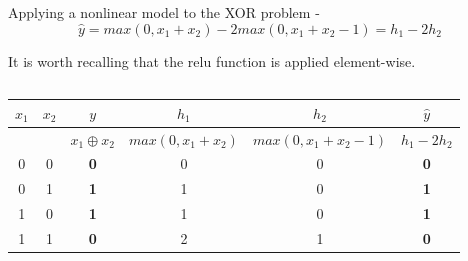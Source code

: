 \begin{frame}[t,allowframebreaks]{Applying a nonlinear model to the XOR problem -}
    \begin{equation}
        \hat{y} = 
        max(0,x_1+x_2) - 2 max(0,x_1+x_2-1) =
        h_1 - 2 h_2
        \label{eq:learn_xor_nonlinear_model_final_w_weights}
    \end{equation}        

    It is worth recalling that the \gls{relu} function is applied element-wise.\\
    \vspace{0.2cm}

    \begin{columns}[t]
        \begin{column}{0.70\textwidth}
            \vspace{-1.1cm}
            \begin{center}
                \begin{tabular}{ c c | c || c  c | c }
                 $x_1$ & 
                 $x_2$ & 
                 {\bf \color{cadmiumred}$y$} & 
                 $h_1$     & 
                 $h_2$ & 
                 {\bf \color{cadmiumgreen}$\hat{y}$} \\ 
                 \hline
                  & 
                  & 
                 {\bf \color{cadmiumred}$x_1 \oplus x_2$} & 
                 $max(0,x_1+x_2)$     & 
                 $max(0,x_1+x_2-1)$ & 
                 {\bf \color{cadmiumgreen}$h_1-2h_2$} \\ 
                 \hline
                 0 & 0 & {\bf \color{cadmiumred}0} & 0 & 0 & {\bf \color{cadmiumgreen}0} \\  
                 0 & 1 & {\bf \color{cadmiumred}1} & 1 & 0 & {\bf \color{cadmiumgreen}1} \\   
                 1 & 0 & {\bf \color{cadmiumred}1} & 1 & 0 & {\bf \color{cadmiumgreen}1} \\  
                 1 & 1 & {\bf \color{cadmiumred}0} & 2 & 1 & {\bf \color{cadmiumgreen}0} \\   
                \end{tabular}
            \end{center}
        \end{column}
        \begin{column}{0.30\textwidth}
        \end{column}
    \end{columns}

\end{frame}


